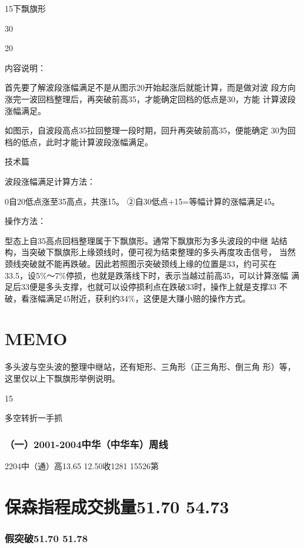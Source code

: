 \documentclass{article}
\begin{document}
15下飘旗形

30

20

内容说明：

首先要了解波段涨幅满足不是从图示20开始起涨后就能计算，而是做对波 段方向涨完一波回档整理后，再突破前高35，才能确定回档的低点是30，方能 计算波段涨幅满足。

如图示，自波段高点35拉回整理一段时期，回升再突破前高35，便能确定 30为回档的低点，此时才能计算波段涨幅满足。

\clearpage

技术篇

波段涨幅满足计算方法：

0自20低点涨至35高点，共涨15。 ②自30低点+15=等幅计算的涨幅满足45。

操作方法：

型态上自35高点回档整理属于下飘旗形。通常下飘旗形为多头波段的中继 站结构，当突破下飘旗形上缘颈线时，便可视为结束整理的多头再度攻击信号， 当然颈线突破就不能再跌破。因此若照图示突破颈线上缘的位置是33，约可买在 33.5，设5\%～7\%停损，也就是跌落线下时，表示当越过前高35，可以计算涨幅 满足后33便是多头支撑，也就可以设停损利点在跌破33时，操作上就是支撑33 不破，看涨幅满足45附近，获利约34\%，这便是大赚小赔的操作方式。

\section{MEMO}

多头波与空头波的整理中继站，还有矩形、三角形（正三角形、倒三角 形）等，这里仅以上下飘旗形举例说明。

15

\clearpage

多空转折一手抓

\subsubsection{（一）2001-2004中华（中华车）周线}

2204中（通）高13.65 12.50收1281 15526第

\section{保森指程成交挑量51.70 54.73}

\subsubsection{假突破51.70 51.78}
\end{document}
